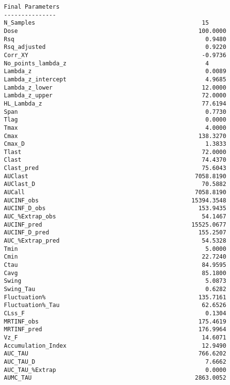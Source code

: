 \documentclass[12pt,a4paper]{article}
\begin{document}
\begin{verbatim}
Final Parameters
---------------
N_Samples                                                15
Dose                                                    100.0000
Rsq                                                       0.9480
Rsq_adjusted                                              0.9220
Corr_XY                                                  -0.9736
No_points_lambda_z                                        4
Lambda_z                                                  0.0089
Lambda_z_intercept                                        4.9685
Lambda_z_lower                                           12.0000
Lambda_z_upper                                           72.0000
HL_Lambda_z                                              77.6194
Span                                                      0.7730
Tlag                                                      0.0000
Tmax                                                      4.0000
Cmax                                                    138.3270
Cmax_D                                                    1.3833
Tlast                                                    72.0000
Clast                                                    74.4370
Clast_pred                                               75.6043
AUClast                                                7058.8190
AUClast_D                                                70.5882
AUCall                                                 7058.8190
AUCINF_obs                                            15394.3548
AUCINF_D_obs                                            153.9435
AUC_%Extrap_obs                                          54.1467
AUCINF_pred                                           15525.0677
AUCINF_D_pred                                           155.2507
AUC_%Extrap_pred                                         54.5328
Tmin                                                      5.0000
Cmin                                                     22.7240
Ctau                                                     84.9595
Cavg                                                     85.1800
Swing                                                     5.0873
Swing_Tau                                                 0.6282
Fluctuation%                                            135.7161
Fluctuation%_Tau                                         62.6526
CLss_F                                                    0.1304
MRTINF_obs                                              175.4619
MRTINF_pred                                             176.9964
Vz_F                                                     14.6071
Accumulation_Index                                       12.9490
AUC_TAU                                                 766.6202
AUC_TAU_D                                                 7.6662
AUC_TAU_%Extrap                                           0.0000
AUMC_TAU                                               2863.0052




\end{verbatim}
\end{document}
